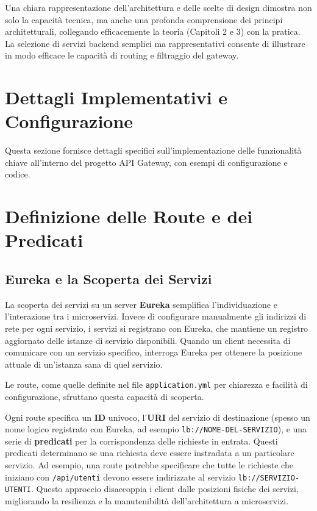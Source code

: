 Una chiara rappresentazione dell'architettura e delle scelte di design dimostra non solo la capacità tecnica, ma anche una profonda comprensione dei principi architetturali, collegando efficacemente la teoria (Capitoli 2 e 3) con la pratica. \\
La selezione di servizi backend semplici ma rappresentativi consente di illustrare in modo efficace le capacità di routing e filtraggio del gateway.

\section{Dettagli Implementativi e Configurazione}

Questa sezione fornisce dettagli specifici sull'implementazione delle funzionalità chiave all'interno del progetto API Gateway, con esempi di configurazione e codice.

\section{Definizione delle Route e dei Predicati}

\subsection[EUREKA]{Eureka e la Scoperta dei Servizi}
La scoperta dei servizi su un server \textbf{Eureka} semplifica l'individuazione e l'interazione tra i microservizi.
Invece di configurare manualmente gli indirizzi di rete per ogni servizio, i servizi si registrano con Eureka, che mantiene un registro aggiornato delle istanze di servizio disponibili.
Quando un client necessita di comunicare con un servizio specifico, interroga Eureka per ottenere la posizione attuale di un'istanza sana di quel servizio.

Le route, come quelle definite nel file \texttt{application.yml} per chiarezza e facilità di configurazione, sfruttano questa capacità di scoperta.

Ogni route specifica un \textbf{ID} univoco, l'\textbf{URI} del servizio di destinazione (spesso un nome logico registrato con Eureka, ad esempio \texttt{lb://NOME-DEL-SERVIZIO}), e una serie di \textbf{predicati} per la corrispondenza delle richieste in entrata.
Questi predicati determinano se una richiesta deve essere instradata a un particolare servizio. Ad esempio, una route potrebbe specificare che tutte le richieste che iniziano con \texttt{/api/utenti} devono essere indirizzate al servizio \texttt{lb://SERVIZIO-UTENTI}.
Questo approccio disaccoppia i client dalle posizioni fisiche dei servizi, migliorando la resilienza e la manutenibilità dell'architettura a microservizi.

